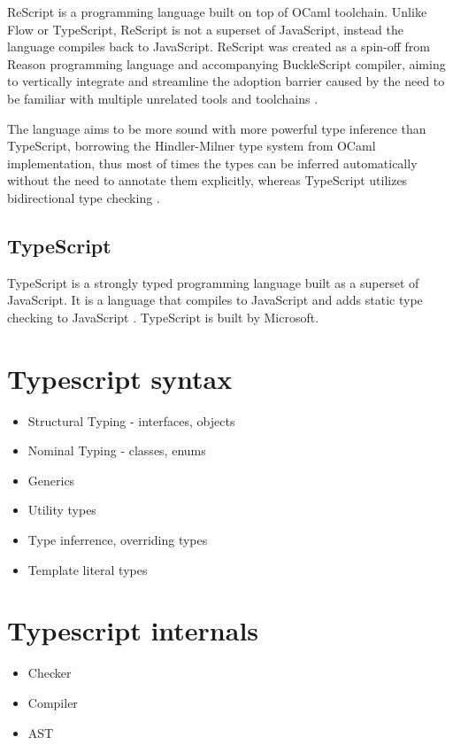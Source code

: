 ReScript is a programming language built on top of OCaml toolchain. Unlike Flow or TypeScript, ReScript is not a superset of JavaScript, instead the language compiles back to JavaScript. ReScript was created as a spin-off from Reason programming language and accompanying BuckleScript compiler, aiming to vertically integrate and streamline the adoption barrier caused by the need to be familiar with multiple unrelated tools and toolchains \cite{BuckleScriptReasonRebranding}.  

The language aims to be more sound with more powerful type inference than TypeScript, borrowing the Hindler-Milner type system from OCaml implementation, thus most of times the types can be inferred automatically without the need to annotate them explicitly, whereas TypeScript utilizes bidirectional type checking \cite{ReconstructingTypeScriptPart}. 

\subsection{TypeScript}

TypeScript is a strongly typed programming language built as a superset of JavaScript. It is a language that compiles to JavaScript and adds static type checking to JavaScript \cite{DocumentationTypeScriptJavaScript}. TypeScript is built by Microsoft. 

\section{Typescript syntax}

\begin{itemize}
  \item Structural Typing - interfaces, objects
  \item Nominal Typing - classes, enums
  \item Generics
  \item Utility types
  \item Type inferrence, overriding types
  \item Template literal types
\end{itemize}

\section{Typescript internals}

\begin{itemize}
  \item Checker
  \item Compiler
  \item AST
\end{itemize}


